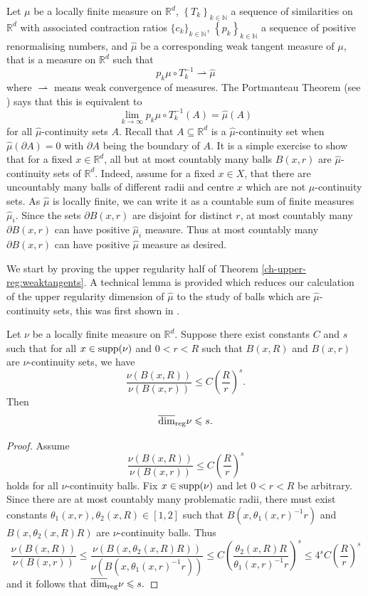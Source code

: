Let $\mu$ be a locally finite measure on $\mathbb{R}^d$, $\left\{T_k\right\}_{k\in \mathbb{N}}$ a sequence of similarities on $\mathbb{R}^d$ with associated contraction ratios $\{c_k\}_{k\in \mathbb{N}}$, $\left\{p_k\right\}_{k\in \mathbb{N}}$ a sequence of positive renormalising numbers, and $\hat{\mu}$ be a corresponding weak tangent measure of $\mu$, that is a measure on $\mathbb{R}^d$ such that 
\[
p_k \mu \circ T^{-1}_k \rightharpoonup \hat{\mu}
\]
where $\rightharpoonup$ means weak convergence of measures. The Portmanteau Theorem (see \cite[Theorem 1.24]{mattila}) says that this is equivalent to 
\[
\lim_{k\rightarrow \infty} p_k \mu \circ T^{-1}_k (A) =\hat{\mu}(A)
\]
for all $\hat{\mu}$-continuity sets $A$. Recall that  $A\subseteq \mathbb{R}^d$ is a $\hat{\mu}$-continuity set when $\hat{\mu}(\partial A) = 0$ with $\partial A$ being the boundary of $A$. It is a simple exercise to show that for a fixed $x \in \mathbb{R}^d$, all but at most countably many balls $B(x,r)$ are $\hat{\mu}$-continuity sets of $\mathbb{R}^d$. Indeed, assume for a fixed $x \in X$, that there are uncountably many balls of different radii and centre $x$ which are not $\hat{\mu}$-continuity sets. As $\hat{\mu}$ is locally finite, we can write it as a countable sum of finite measures $\hat{\mu}_i$. Since the sets $\partial B(x,r)$ are disjoint for distinct $r$, at most countably many $\partial B(x,r)$ can have positive $\hat{\mu}_i$ measure. Thus at most countably many $\partial B(x,r)$ can have positive $\hat{\mu}$ measure as desired.


We start by proving the upper regularity half of Theorem \ref{ch-upper-reg:weaktangents}. A technical lemma is provided which reduces our calculation of the upper regularity dimension of $\hat \mu$ to the study of balls which are $\hat{\mu}$-continuity sets, this was first shown in \cite{fraser-howroyd2}.


\begin{lemma}\label{ch-upper-reg:nu-cont-upper-dim}
	Let $\nu$ be a locally finite measure  on $ \mathbb{R}^d$. Suppose there exist constants $C$ and $s$ such that for all $x\in \textup{supp}(\nu)$ and $0<r<R$ such that $B(x,R)$ and $B(x,r)$ are $\nu$-continuity sets, we have
	\[
	\frac{\nu(B(x,R))}{\nu(B(x,r))} \leq C\left(\frac{R}{r}\right)^{s}.
	\]
	Then $$\overline{\dim}_{\textup{reg}}  \nu \le s.$$
\end{lemma}

\begin{proof}
	Assume 
	\[
	\frac{\nu(B(x,R))}{\nu(B(x,r))} \leq C\left(\frac{R}{r}\right)^{s}
	\]
	holds for all $\nu$-continuity balls. Fix $x  \in \textup{supp}(\nu)$ and let $0<r<R$ be arbitrary. Since there are at most countably many problematic radii, there must exist constants $\theta_1(x,r),\theta_2(x,R)\in[1,2]$ such that $B(x,\theta_1(x,r)^{-1}r)$ and $B(x,\theta_2(x,R) R)$ are $\nu$-continuity balls. Thus
	\[
	\frac{\nu(B(x,R))}{\nu(B(x,r))} \leq \frac{\nu(B(x,\theta_2(x,R)R))}{\nu(B(x,\theta_1(x,r)^{-1}r))} \le   C\left(\frac{\theta_2(x,R)R}{\theta_1(x,r)^{-1}r}\right)^{s} \le 4^s C \left(\frac{R}{r}\right)^{s}
	\]
	and it follows that $\overline{\dim}_{\textup{reg}}  \nu \le s.$
\end{proof}

